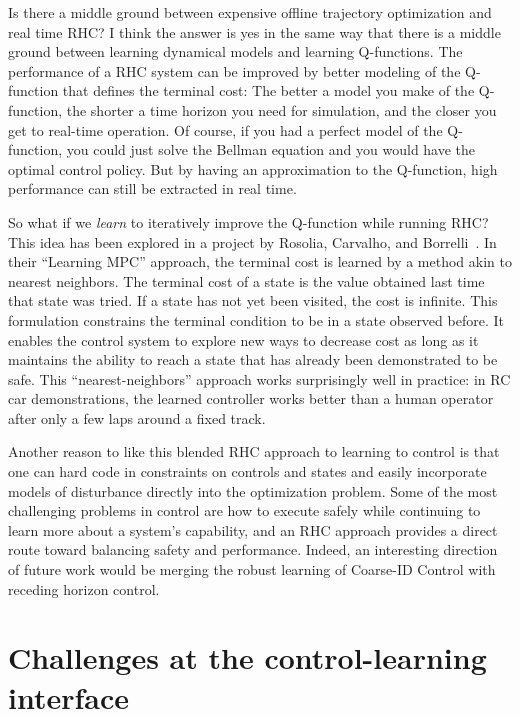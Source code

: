 \documentclass[11pt]{article}
\numberwithin{equation}{section}
\begin{document}
Is there a middle ground between expensive offline trajectory optimization and real time RHC? I think the answer is yes in the same way that there is a middle ground between learning dynamical models and learning Q-functions.  The performance of a RHC system can be improved by better modeling of the Q-function that defines the terminal cost: The better a model you make of the Q-function, the shorter a time horizon you need for simulation, and the closer you get to real-time operation.  Of course, if you had a perfect model of the  Q-function, you could just solve the Bellman equation and you would have the optimal control policy. But by having an approximation to the Q-function, high performance can still be extracted in real time.

So what if we \emph{learn} to iteratively improve the Q-function while running RHC? This idea has been explored in a project by Rosolia, Carvalho, and Borrelli~\cite{Rosolia17}. In their ``Learning MPC'' approach, the terminal cost is learned by a method akin to nearest neighbors. The terminal cost of a state is the value obtained last time that state was tried. If a state has not yet been visited, the cost is infinite. This formulation constrains the terminal condition to be in a state observed before. It enables the control system to explore new ways to decrease cost as long as it maintains the ability to reach a state that has already been demonstrated to be safe. This ``nearest-neighbors'' approach works surprisingly well in practice: in RC car demonstrations, the learned controller works better than a human operator after only a few laps around a fixed track. 

Another reason to like this blended RHC approach to learning to control is that one can hard code in constraints on controls and states and easily incorporate models of disturbance directly into the optimization problem. Some of the most challenging problems in control are how to execute safely while continuing to learn more about a system's capability, and an RHC approach provides a direct route toward balancing safety and performance.  Indeed, an interesting direction of future work would be merging the robust learning of Coarse-ID Control with receding horizon control.

\section{Challenges at the control-learning interface} 
\end{document}
